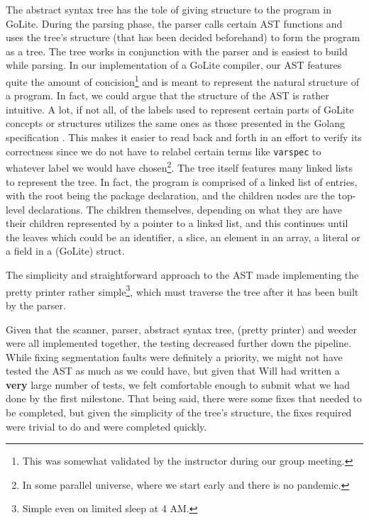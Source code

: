 \documentclass{article}
\begin{document}
The abstract syntax tree has the tole of giving structure to the program in GoLite. During the parsing phase, the parser calls certain AST functions and uses the tree's structure (that has been decided beforehand) to form the program as a tree. The tree works in conjunction with the parser and is easiest to build while parsing. In our implementation of a GoLite compiler, our AST features quite the amount of concision\footnote{This was somewhat validated by the instructor during our group meeting.} and is meant to represent the natural structure of a program. In fact, we could argue that the structure of the AST is rather intuitive. A lot, if not all, of the labels used to represent certain parts of GoLite concepts or structures utilizes the same ones as those presented in the Golang specification \cite{gospec}. This makes it easier to read back and forth in an effort to verify its correctness since we do not have to relabel certain terms like \texttt{varspec} to whatever label we would have chosen\footnote{In some parallel universe, where we start early and there is no pandemic.}. The tree itself features many linked lists to represent the tree. In fact, the program is comprised of a linked list of entries, with the root being the package declaration, and the children nodes are the top-level declarations. The children themselves, depending on what they are have their children represented by a pointer to a linked list, and this continues until the leaves which could be an identifier, a slice, an element in an array, a literal or a field in a (GoLite) struct.

The simplicity and straightforward approach to the AST made implementing the pretty printer rather simple\footnote{Simple even on limited sleep at 4 AM.}, which must traverse the tree after it has been built by the parser.


Given that the scanner, parser, abstract syntax tree, (pretty printer) and weeder were all implemented together, the testing decreased further down the pipeline. While fixing segmentation faults were definitely a priority, we might not have tested the AST as much as we could have, but given that Will had written a \textbf{very} large number of tests, we felt comfortable enough to submit what we had done by the first milestone. That being said, there were some fixes that needed to be completed, but given the simplicity of the tree's structure, the fixes required were trivial to do and were completed quickly.
\end{document}
